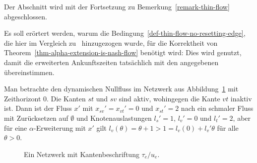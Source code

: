 Der Abschnitt wird mit der Fortsetzung zu Bemerkung~\ref{remark-thin-flow} abgeschlossen.
\begin{remark}\label{remark-thin-flow-part-2}
	Es soll erörtert werden, warum die Bedingung~\ref{def-thin-flow-no-resetting-edge}, die hier im Vergleich zu~\cite[Definition~6]{Koch2011} hinzugezogen wurde, für die Korrektheit von Theorem~\ref{thm-alpha-extension-is-nash-flow} benötigt wird:
	Dies wird genutzt, damit die erweiterten Ankunftszeiten tatsächlich mit den angegebenen übereinstimmen.
	
	Man betrachte den dynamischen Nullfluss im Netzwerk aus Abbildung~\ref{figure-labels} mit Zeithorizont $0$.
	Die Kanten $st$ und $sv$ sind aktiv, wohingegen die Kante $vt$ inaktiv ist.
	Dann ist der Fluss $x'$ mit $x_{sv}'=x_{vt}' = 0$ und $x_{st}'=2$ nach \cite[Definition 6]{Koch2011} ein schmaler Fluss mit Zurücksetzen auf $\emptyset$ und Knotenauslastungen $l_s' = 1$, $l_v' = 0$ und $l_t' = 2$, aber für eine $\alpha$-Erweiterung mit $x'$ gilt $l_v(\theta) = \theta + 1 > 1 = l_v(0) + l_v' \theta$ für alle $\theta > 0$.

	\begin{figure}[h!]
		\centering
		\caption{Ein Netzwerk mit Kantenbeschriftung $\tau_e / u_e$.}
		\label{figure-labels}
	\end{figure}
	
\end{remark}

